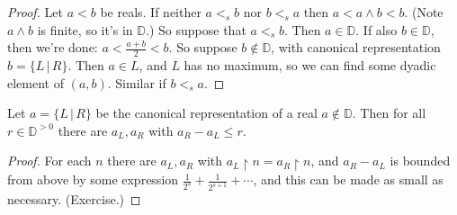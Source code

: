 \begin{proof}
Let $a<b$ be reals. If neither $a <_s b$ nor $b <_s a$ then $a < a\wedge b < b$. (Note $a\wedge b$ is finite, so it's in $\mathbb{D}$.) So suppose that $a <_s b$. Then $a\in \mathbb{D}$. If also $b\in\mathbb{D}$, then we're done:
$a < \frac{a+b}2 < b$. So suppose $b\notin \mathbb{D}$, with canonical representation $b = \{ L \,|\, R\}$. Then $a\in L$,
and $L$ has no maximum, so we can find some dyadic element of $(a,b)$. Similar if $b <_s a$.
\end{proof}

\begin{lemma} \label{3.12}
Let $a = \{ L \,|\, R \}$ be the canonical representation of a real $a\notin \mathbb{D}$. Then for all $r\in \mathbb{D}^{>0}$ there are $a_L, a_R$ with $a_R-a_L\le r$. 
\end{lemma}

\begin{proof}
For each $n$ there are $a_L,a_R$ with $a_L\restriction n = a_R\restriction n$, and $a_R-a_L$ is bounded from above by some expression $\frac1{2^s} + \frac{1}{2^{s+1}}+\cdots$, and this can be made as small as necessary. (Exercise.)
\end{proof}


